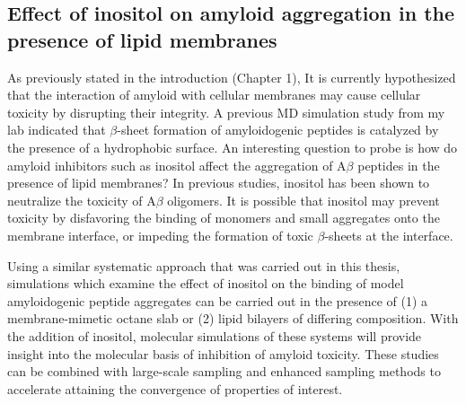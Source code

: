 \subsection{Effect of inositol on amyloid aggregation in the presence of lipid membranes}
As previously stated in the introduction (Chapter 1), It is currently hypothesized that the interaction of amyloid with cellular membranes may cause cellular toxicity by disrupting their integrity.\cite{Pastor:2008p23}  A previous MD simulation study from my lab indicated that $\beta$-sheet formation of amyloidogenic peptides is catalyzed by the presence of a hydrophobic surface.\cite{Nikolic:2010go}  An interesting question to probe is how do amyloid inhibitors such as inositol affect the aggregation of A$\beta$ peptides in the presence of lipid membranes? In previous studies, inositol has been shown to neutralize the toxicity of A$\beta$ oligomers.\cite{McLaurin:2000bq}  It is possible that inositol may prevent toxicity by disfavoring the binding of monomers and small aggregates onto the membrane interface, or impeding the formation of toxic $\beta$-sheets at the interface.

Using a similar systematic approach that was carried out in this thesis, simulations which examine the effect of inositol on the binding of model amyloidogenic peptide aggregates can be carried out in the presence of (1) a membrane-mimetic octane slab\cite{Nikolic:2010go} or (2) lipid bilayers of differing composition. With the addition of inositol, molecular simulations of these systems will provide insight into the  molecular basis of inhibition of amyloid toxicity. These studies can be combined with large-scale sampling and enhanced sampling methods\cite{Rauscher:2009wr} to accelerate attaining the convergence of properties of interest.\cite{Neale:2011cn}

